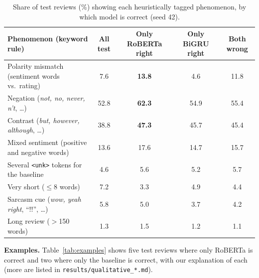 \documentclass[11pt,a4paper]{article}
\begin{document}
\begin{table}[htbp]
\centering\small
\caption{Share of test reviews (\%) showing each heuristically tagged phenomenon, by which model is correct (seed 42).}
\label{tab:tags}
\begin{tabular}{lcccc}
\toprule
\textbf{Phenomenon (keyword rule)} & \textbf{All test} & \textbf{Only RoBERTa right} & \textbf{Only BiGRU right} & \textbf{Both wrong} \\
\midrule
Polarity mismatch (sentiment words vs.\ rating) & 7.6 & \textbf{13.8} & 4.6 & 11.8 \\
Negation (\textit{not, no, never, n't}, \dots) & 52.8 & \textbf{62.3} & 54.9 & 55.4 \\
Contrast (\textit{but, however, although}, \dots) & 38.8 & \textbf{47.3} & 45.7 & 45.4 \\
Mixed sentiment (positive and negative words) & 13.6 & 17.6 & 14.7 & 15.7 \\
Several \texttt{<unk>} tokens for the baseline & 4.6 & 5.6 & 5.2 & 5.7 \\
Very short ($\leq$8 words) & 7.2 & 3.3 & 4.9 & 4.4 \\
Sarcasm cue (\textit{wow, yeah right}, ``!!'', \dots) & 5.8 & 5.0 & 3.7 & 4.2 \\
Long review ($>$150 words) & 1.3 & 1.5 & 1.2 & 1.1 \\
\bottomrule
\end{tabular}
\end{table}

\textbf{Examples.} Table~\ref{tab:examples} shows five test reviews where only RoBERTa is correct and two where only the baseline is correct, with our explanation of each (more are listed in \texttt{results/qualitative\_*.md}).
\end{document}
